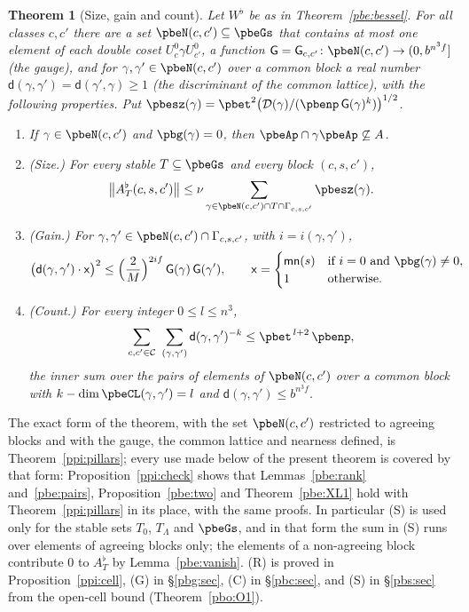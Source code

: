 \documentclass[10pt]{amsart}
\newtheorem{theorem}{Theorem}[section]
\theoremstyle{definition}
\theoremstyle{remark}
\begin{document}
\begin{theorem}[Size, gain and count]\label{pbe:pillars}
Let $W^\flat$ be as in Theorem~\ref{pbe:bessel}. For all classes $c,c'$ there are a set $\pbeN(c,c')
\subseteq\pbeGs$ that contains at most one element of each double coset $U_c^0\gamma U_{c'}^0$, a
function $\mathsf G=\mathsf G_{c,c'}\colon\pbeN(c,c')\to(0,b^{n^3f}]$ (the \emph{gauge}), and for
$\gamma,\gamma'\in\pbeN(c,c')$ over a common block a real number $\mathsf d(\gamma,\gamma')=\mathsf d(
\gamma',\gamma)\ge1$ (the discriminant of the common lattice), with the following properties. Put
$\pbesz(\gamma)=\pbet^2\bigl(\mathcal D(\gamma)/(\pbenp\,\mathsf G(\gamma)^k)\bigr)^{1/2}$.
\begin{enumerate}
\item[(R)] If $\gamma\in\pbeN(c,c')$ and $\pbg(\gamma)=0$, then $\pbeAp\cap\gamma\pbeAp\not\subseteq
A$.
\item[(S)] \emph{(Size.)} For every stable $T\subseteq\pbeGs$ and every block $(c,s,c')$,
\[
\bigl\|A_T^\flat(c,s,c')\bigr\|\le\nu\sum_{\gamma\in\pbeN(c,c')\cap T\cap\Gamma_{c,s,c'}}\pbesz(\gamma).
\]
\item[(G)] \emph{(Gain.)} For $\gamma,\gamma'\in\pbeN(c,c')\cap\Gamma_{c,s,c'}$, with $i=i(\gamma,
\gamma')$,
\[
\bigl(\mathsf d(\gamma,\gamma')\cdot\mathsf x\bigr)^2\le\Bigl(\frac2M\Bigr)^{2if}\,\mathsf G(\gamma)\,
\mathsf G(\gamma'),\qquad\mathsf x=\begin{cases}\mathsf{mn}(s)&\text{if }i=0\text{ and }\pbg(\gamma)
\ne0,\\1&\text{otherwise.}\end{cases}
\]
\item[(C)] \emph{(Count.)} For every integer $0\le l\le n^3$,
\[
\sum_{c,c'\in\mathcal C}\ \sum_{(\gamma,\gamma')}\mathsf d(\gamma,\gamma')^{-k}\le\pbet^{\,l+2}\,\pbenp ,
\]
the inner sum over the pairs of elements of $\pbeN(c,c')$ over a common block with $k-\dim\pbeCL(
\gamma,\gamma')=l$ and $\mathsf d(\gamma,\gamma')\le b^{n^3f}$.
\end{enumerate}
\end{theorem}
\smallskip\noindent The exact form of the theorem, with the set $\pbeN(c,c')$ restricted to agreeing blocks and with the gauge, the common lattice and nearness defined, is Theorem~\ref{ppi:pillars}; every use made below of the present theorem is covered by that form: Proposition~\ref{ppi:check} shows that Lemmas~\ref{pbe:rank} and~\ref{pbe:pairs}, Proposition~\ref{pbe:two} and Theorem~\ref{pbe:XL1} hold with Theorem~\ref{ppi:pillars} in its place, with the same proofs. In particular \textup{(S)} is used only for the stable sets $T_0$, $T_\Lambda$ and $\pbeGs$, and in that form the sum in \textup{(S)} runs over elements of agreeing blocks only; the elements of a non-agreeing block contribute $0$ to $A^\flat_T$ by Lemma~\ref{pbe:vanish}. \textup{(R)} is proved in Proposition~\ref{ppi:cell}, \textup{(G)} in \S\ref{pbg:sec}, \textup{(C)} in \S\ref{pbc:sec}, and \textup{(S)} in \S\ref{pbs:sec} from the open-cell bound (Theorem~\ref{pbo:O1}).\par\smallskip
\end{document}
